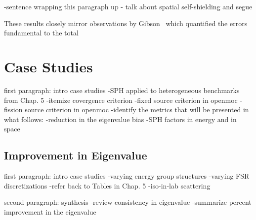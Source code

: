 -sentence wrapping this paragraph up - talk about spatial self-shielding and segue

These results closely mirror observations by Gibson~\cite{gibson2016thesis} which quantified the errors fundamental to the total 


\section{Case Studies}
\label{sec:chap6-sph-case-studies}

first paragraph: intro case studies
-SPH applied to heterogeneous benchmarks from Chap. 5
-itemize covergence criterion
-fixed source criterion in openmoc
-fission source criterion in openmoc
-identify the metrics that will be presented in what follows:
  -reduction in the eigenvalue bias
  -SPH factors in energy and in space

\subsection{Improvement in Eigenvalue}
\label{subsubsec:chap6-sph-eigenvalues}

first paragraph: intro case studies
-varying energy group structures
-varying \ac{FSR} discretizations
-refer back to Tables in Chap. 5
-iso-in-lab scattering

second paragraph: synthesis
-review consistency in eigenvalue
-summarize percent improvement in the eigenvalue

